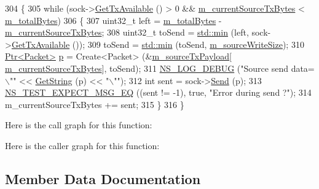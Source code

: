 \begin{DoxyCode}
304 \{
305   \textcolor{keywordflow}{while} (sock->\hyperlink{classns3_1_1Socket_ae7cf62e3acf44106bfa1d40eaeaec151}{GetTxAvailable} () > 0 && \hyperlink{classTcpTestCase_a41135a441155aab8e7d80acdf7c1a959}{m\_currentSourceTxBytes} < 
      \hyperlink{classTcpTestCase_a9b4497e157a0b1fb7fdf90e833696201}{m\_totalBytes})
306     \{
307       uint32\_t left = \hyperlink{classTcpTestCase_a9b4497e157a0b1fb7fdf90e833696201}{m\_totalBytes} - \hyperlink{classTcpTestCase_a41135a441155aab8e7d80acdf7c1a959}{m\_currentSourceTxBytes};
308       uint32\_t toSend = \hyperlink{80211b_8c_ac6afabdc09a49a433ee19d8a9486056d}{std::min} (left, sock->\hyperlink{classns3_1_1Socket_ae7cf62e3acf44106bfa1d40eaeaec151}{GetTxAvailable} ());
309       toSend = \hyperlink{80211b_8c_ac6afabdc09a49a433ee19d8a9486056d}{std::min} (toSend, \hyperlink{classTcpTestCase_af2488464ac4a6aa734ab2fa3a8f1255e}{m\_sourceWriteSize});
310       \hyperlink{classns3_1_1Ptr}{Ptr<Packet>} \hyperlink{lte__link__budget_8m_ac9de518908a968428863f829398a4e62}{p} = Create<Packet> (&\hyperlink{classTcpTestCase_a04a966fbc1e4ab5a06cb67ce1279032b}{m\_sourceTxPayload}[
      \hyperlink{classTcpTestCase_a41135a441155aab8e7d80acdf7c1a959}{m\_currentSourceTxBytes}], toSend);
311       \hyperlink{group__logging_ga413f1886406d49f59a6a0a89b77b4d0a}{NS\_LOG\_DEBUG} (\textcolor{stringliteral}{"Source send data=\(\backslash\)""} << \hyperlink{tcp-test_8cc_ab9425fc2dc406843f955d1565b7fc804}{GetString} (p) << \textcolor{stringliteral}{"\(\backslash\)""});
312       \textcolor{keywordtype}{int} sent = sock->\hyperlink{classns3_1_1Socket_a036901c8f485fe5b6eab93b7f2ec289d}{Send} (p);
313       \hyperlink{group__testing_ga7304ba46a28d8cf08dfdfd6499cf7068}{NS\_TEST\_EXPECT\_MSG\_EQ} ((sent != -1), \textcolor{keyword}{true}, \textcolor{stringliteral}{"Error during send ?"});
314       m\_currentSourceTxBytes += sent;
315     \}
316 \}
\end{DoxyCode}


Here is the call graph for this function\+:




Here is the caller graph for this function\+:




\subsection{Member Data Documentation}
